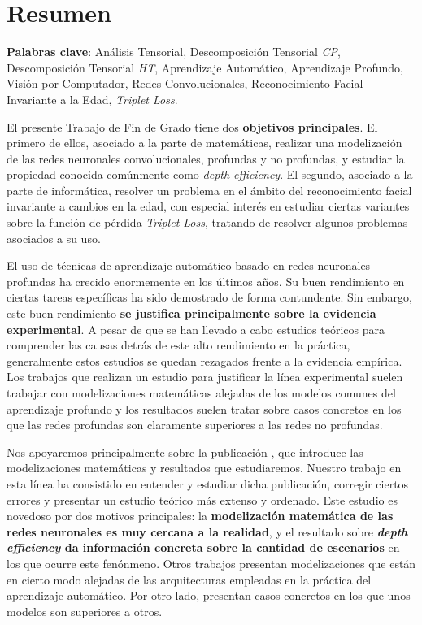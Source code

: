 %



\chapter{Resumen}

\textbf{Palabras clave}: Análisis Tensorial, Descomposición Tensorial \textit{CP}, Descomposición Tensorial \textit{HT}, Aprendizaje Automático, Aprendizaje Profundo, Visión por Computador, Redes Convolucionales, Reconocimiento Facial Invariante a la Edad, \textit{Triplet Loss}.

El presente Trabajo de Fin de Grado tiene dos \textbf{objetivos principales}. El primero de ellos, asociado a la parte de matemáticas, realizar una modelización de las redes neuronales convolucionales, profundas y no profundas, y estudiar la propiedad conocida comúnmente como \textit{depth efficiency}. El segundo, asociado a la parte de informática, resolver un problema en el ámbito del reconocimiento facial invariante a cambios en la edad, con especial interés en estudiar ciertas variantes sobre la función de pérdida \textit{Triplet Loss}, tratando de resolver algunos problemas asociados a su uso.

El uso de técnicas de aprendizaje automático basado en redes neuronales profundas ha crecido enormemente en los últimos años. Su buen rendimiento en ciertas tareas específicas ha sido demostrado de forma contundente. Sin embargo, este buen rendimiento \textbf{se justifica principalmente sobre la evidencia experimental}. A pesar de que se han llevado a cabo estudios teóricos para comprender las causas detrás de este alto rendimiento en la práctica, generalmente estos estudios se quedan rezagados frente a la evidencia empírica. Los trabajos que realizan un estudio para justificar la línea experimental suelen trabajar con modelizaciones matemáticas alejadas de los modelos comunes del aprendizaje profundo y los resultados suelen tratar sobre casos concretos en los que las redes profundas son claramente superiores a las redes no profundas.

Nos apoyaremos principalmente sobre la publicación \cite{matematicas:principal}, que introduce las modelizaciones matemáticas y resultados que estudiaremos. Nuestro trabajo en esta línea ha consistido en entender y estudiar dicha publicación, corregir ciertos errores y presentar un estudio teórico más extenso y ordenado. Este estudio es novedoso por dos motivos principales: la \textbf{modelización matemática de las redes neuronales es muy cercana a la realidad}, y el resultado sobre \textbf{\textit{depth efficiency} da información concreta sobre la cantidad de escenarios} en los que ocurre este fenónmeno. Otros trabajos presentan modelizaciones que están en cierto modo alejadas de las arquitecturas empleadas en la práctica del aprendizaje automático. Por otro lado, presentan casos concretos en los que unos modelos son superiores a otros.

